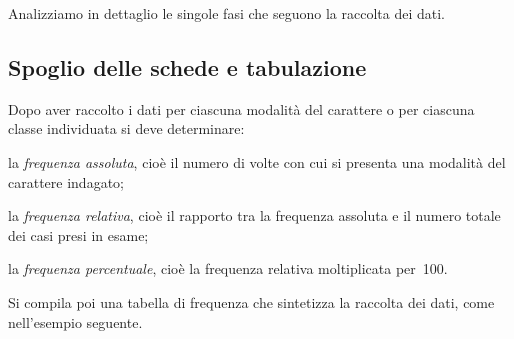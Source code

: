 Analizziamo in dettaglio le singole fasi che seguono la raccolta dei dati.

\subsection{Spoglio delle schede e tabulazione}
Dopo aver raccolto i dati per ciascuna modalità del carattere o per ciascuna classe individuata si deve determinare:

\begin{itemize*}
\item la \emph{frequenza assoluta}, cioè il numero di volte con cui si presenta una modalità del carattere indagato;
\item la \emph{frequenza relativa}, cioè il rapporto tra la frequenza assoluta e il numero totale dei casi presi in esame;
\item la \emph{frequenza percentuale}, cioè la frequenza relativa moltiplicata per~100.
\end{itemize*}
Si compila poi una tabella di frequenza che sintetizza la raccolta dei dati, come nell'esempio seguente.

